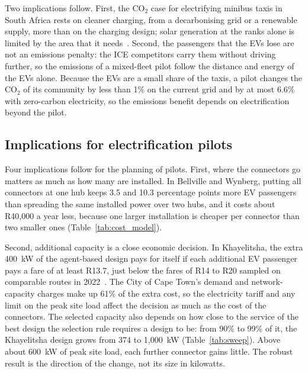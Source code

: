\documentclass{elsarticle}
\begin{document}
Two implications follow. First, the CO$_2$ case for electrifying minibus taxis in South Africa rests on cleaner charging, from a decarbonising grid or a renewable supply, more than on the charging design; solar generation at the ranks alone is limited by the area that it needs~\cite{abraham2021_solar_embt_charging}. Second, the passengers that the EVs lose are not an emissions penalty: the ICE competitors carry them without driving further, so the emissions of a mixed-fleet pilot follow the distance and energy of the EVs alone. Because the EVs are a small share of the taxis, a pilot changes the CO$_2$ of its community by less than 1\% on the current grid and by at most 6.6\% with zero-carbon electricity, so the emissions benefit depends on electrification beyond the pilot.

\subsection{Implications for electrification pilots}
\label{sec:discussion_implications}

Four implications follow for the planning of pilots. First, where the connectors go matters as much as how many are installed. In Bellville and Wynberg, putting all connectors at one hub keeps 3.5 and 10.3 percentage points more EV passengers than spreading the same installed power over two hubs, and it costs about R40,000 a year less, because one larger installation is cheaper per connector than two smaller ones (Table~\ref{tab:cost_model}).

Second, additional capacity is a close economic decision. In Khayelitsha, the extra 400~kW of the agent-based design pays for itself if each additional EV passenger pays a fare of at least R13.7, just below the fares of R14 to R20 sampled on comparable routes in 2022~\cite{coct2023_citp}. The City of Cape Town's demand and network-capacity charges make up 61\% of the extra cost, so the electricity tariff and any limit on the peak site load affect the decision as much as the cost of the connectors. The selected capacity also depends on how close to the service of the best design the selection rule requires a design to be: from 90\% to 99\% of it, the Khayelitsha design grows from 374 to 1,000~kW (Table~\ref{tab:sweep}). Above about 600~kW of peak site load, each further connector gains little. The robust result is the direction of the change, not its size in kilowatts.
\end{document}
